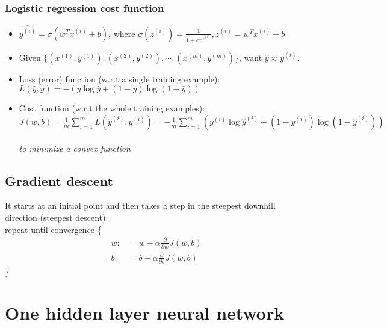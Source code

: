 \subsubsection{Logistic regression cost function}
\begin{itemize}
\item[]
$\hat{y^{(i)}} = \sigma(w^Tx^{(i)} + b)$, where $\sigma(z^{(i)}) = \frac{1}{1+e^{-z^{(i)}}}, z^{(i)} = w^Tx^{(i)} + b$
\item[]
Given $\{(x^{(1)}, y^{(1)}), (x^{(2)}, y^{(2)}), \cdots, (x^{(m)}, y^{(m)})\}$, want $\hat{y} \approx y^{(i)}$.
\item[]
Loss (error) function (w.r.t a single training example):\\
$L(\hat{y}, y) = -\left( y\log{\hat{y}} + (1-y)\log{(1-\hat{y})}\right)$
\item[]
Cost function (w.r.t the whole training examples):\\
$J(w, b) = \frac{1}{m}\sum_{i = 1}^mL(\hat{y}^{(i)}, y^{(i)}) = -\frac{1}{m}\sum_{i = 1}^m\left( y^{(i)}\log{\hat{y}^{(i)}} + (1-y^{(i)})\log{(1-\hat{y}^{(i)})}\right)$\\\\
\textit{to minimize a convex function}
\end{itemize}

%
\subsection{Gradient descent}
It starts at an initial point and then takes a step in the steepest downhill direction (steepest descent).\\
repeat until convergence \{ \\
	\begin{align}
	w: &= w - \alpha \frac{\partial }{\partial w} J(w, b)\\	
	b: &= b - \alpha \frac{\partial }{\partial b} J(w, b)
	\end{align}
	\}

\section{One hidden layer neural network}
\label{sec:1NN}
%
